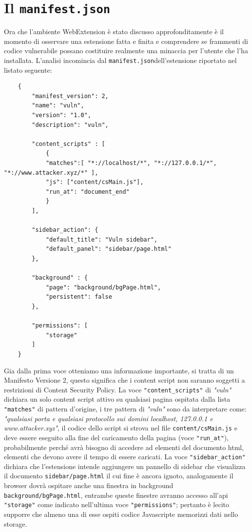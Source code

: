 \documentclass{sapthesis}
\newcommand{\code}[1]{\texttt{#1}}
\newcommand{\file}[1]{\code{#1}}
\newcommand{\vuln}{\textit{"vuln"}}
\newcommand{\JS}{Javascript}
\newcommand{\manifest}{\code{manifest.json}}
\begin{document}
    \section{Il \manifest}
    \label{sec:analisi-vuln-manifest}
        Ora che l'ambiente WebExtension è stato discusso approfonditamente è il momento di
        osservare una estensione fatta e finita e comprendere se frammenti di codice vulnerabile
        possano costituire realmente una minaccia per l'utente che l'ha installata.
        L'analisi incomincia dal \manifest dell'estensione riportato nel listato seguente:
        \begin{lstlisting}
    {
        "manifest_version": 2,
        "name": "vuln",
        "version": "1.0",
        "description": "vuln",

        "content_scripts" : [
            {
            "matches":[ "*://localhost/*", "*://127.0.0.1/*", "*://www.attacker.xyz/*" ],
            "js": ["content/csMain.js"],
            "run_at": "document_end"
            }
        ],

        "sidebar_action": {
            "default_title": "Vuln sidebar",
            "default_panel": "sidebar/page.html"
        },

        "background" : {
            "page": "background/bgPage.html",
            "persistent": false
        },

        "permissions": [
            "storage"
        ]
    }
        \end{lstlisting}
        Gia dalla prima voce otteniamo una informazione importante, si tratta di un Manifesto Versione 2,
        questo significa che i content script non saranno soggetti a restrizioni di Content Security Policy.
        La voce \code{"content\_scripts"} di \vuln{} dichiara un solo content script attivo su qualsiasi pagina ospitata dalla
        lista \code{"matches"} di pattern d'origine, i tre pattern di \vuln{} sono da interpretare come:
        \textit{"qualsiasi porta e qualsiasi protocollo sui domini localhost, 127.0.0.1 e www.attacker.xyz"},
        il codice dello script si strova nel file \file{content/csMain.js} e deve essere eseguito
        alla fine del caricamento della pagina (voce \code{"run\_at"}), probabilmente perché avrà bisogno
        di accedere ad elementi del documento html, elementi che devono avere il tempo di essere caricati.
        La voce \code{"sidebar\_action"} dichiara che l'estensione intende aggiungere un pannello di sidebar
        che visualizza il documento \file{sidebar/page.html} il cui fine è ancora ignoto, analogamente
        il browser dovrà ospitare anche una finestra in background \file{background/bgPage.html}, entrambe
        queste finestre avranno accesso all'api \code{"storage"} come indicato nell'ultima voce \code{"permissions"};
        pertanto è lecito supporre che almeno una di esse ospiti codice \JS e memorizzi dati nello storage.
        
\end{document}
